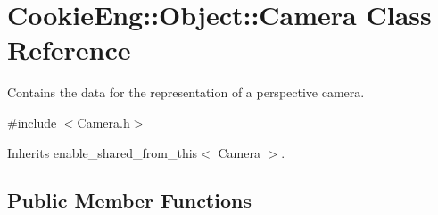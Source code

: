 \hypertarget{class_cookie_eng_1_1_object_1_1_camera}{}\section{Cookie\+Eng\+:\+:Object\+:\+:Camera Class Reference}
\label{class_cookie_eng_1_1_object_1_1_camera}


Contains the data for the representation of a perspective camera.  




{\ttfamily \#include $<$Camera.\+h$>$}



Inherits enable\+\_\+shared\+\_\+from\+\_\+this$<$ Camera $>$.

\subsection*{Public Member Functions}
